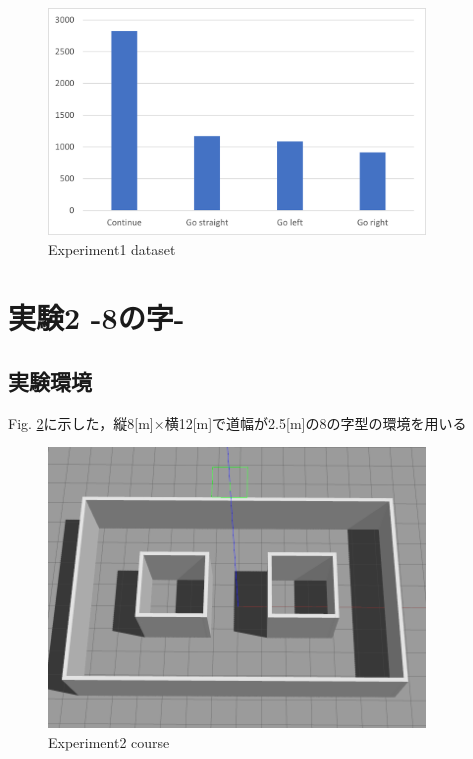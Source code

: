 \begin{figure}[ht]
  \centering
  \includegraphics[width = 10cm]{./figs/exp1_result.png}
  \caption{Experiment1 dataset}
  \label{fig::exp1_result}
\end{figure}
\newpage
\section{実験2 -8の字-}
\subsection{実験環境}
Fig. \ref{fig::hatinozi}に示した，縦8[m]×横12[m]で道幅が2.5[m]の8の字型の環境を用いる
\begin{figure}[h]
    \centering
    \includegraphics[width = 10cm]{./figs/coli.png}
    \caption{Experiment2 course}
    \label{fig::hatinozi}
\end{figure}

